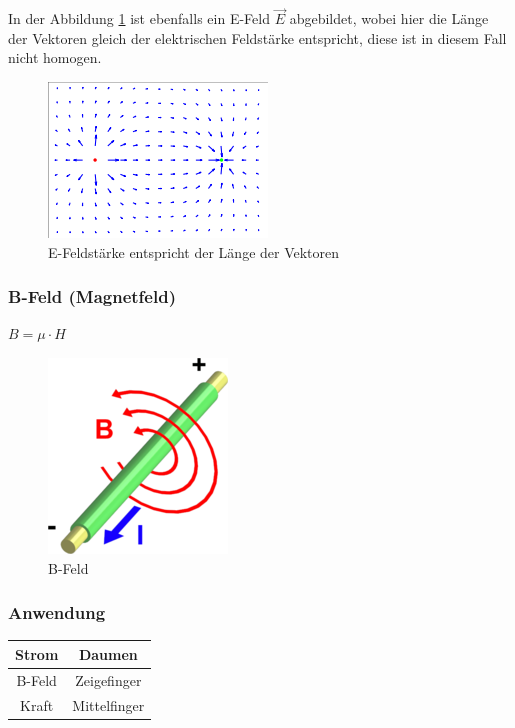 \documentclass[a4paper]{scrartcl}
\begin{document}
In der Abbildung \ref{fig:E-Feldstaerke} ist ebenfalls ein E-Feld $ \vec{E} $ abgebildet, wobei hier die Länge der Vektoren gleich der elektrischen Feldstärke entspricht, diese ist in diesem Fall nicht homogen.

\begin{figure}[h!]
\begin{center}
\includegraphics[scale=0.5]{images/E-Feldstaerke.png}
\caption{E-Feldstärke entspricht der Länge der Vektoren}
\label{fig:E-Feldstaerke}
\end{center}
\end{figure}



\subsubsection{B-Feld (Magnetfeld)}
$B = \mu \cdot H$\\
\begin{figure}[h!]
\begin{center}
\includegraphics[scale=0.5]{images/B-Feld.png}
\caption{B-Feld}
\label{fig:B-Feld}
\end{center}
\end{figure}

\subsubsection{Anwendung}

\begin{center}
\begin{tabular}{|c|c|}

\hline Strom & Daumen \\ 
\hline B-Feld & Zeigefinger \\ 
\hline Kraft & Mittelfinger \\ 
\hline 

\end{tabular} 
\end{center}
\end{document}
